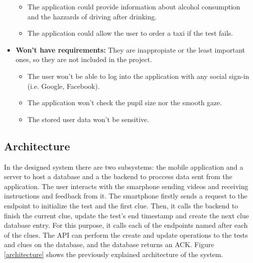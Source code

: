 \begin{itemize}
\begin{itemize}
      \item The application could provide information about alcohol consumption and the hazzards of driving after drinking.
      \item The application could allow the user to order a taxi if the test fails.
    \end{itemize}
  \item \textbf{Won't have requirements:} They are inappropiate or the least important ones, so they are not included in the project.
    \begin{itemize}
      \item The user won't be able to log into the application with any social sign-in (i.e. Google, Facebook).
      \item The application won't check the pupil size nor the smooth gaze.
      \item The stored user data won't be sensitive.
    \end{itemize}
\end{itemize}

\subsection{Architecture}

In the designed system there are two subsystems: the mobile application and a server to host a database and a the backend to proccess data sent from the application. The user interacts with the smarphone sending videos and receiving instructions and feedback from it. The smartphone firstly sends a request to the endpoint to initialize the test and the first clue. Then, it calls the backend to finish the current clue, update the test's end timestamp and create the next clue database entry. For this purpose, it calls each of the endpoints named after each of the clues. The API can perform the create and update operations to the tests and clues on the database, and the database returns an ACK. Figure \ref{architecture} shows the previously explained architecture of the system.

